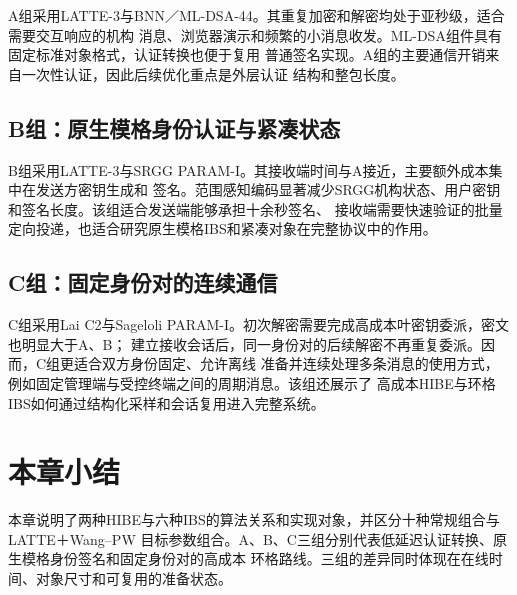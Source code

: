 A组采用LATTE-3与BNN／ML-DSA-44。其重复加密和解密均处于亚秒级，适合需要交互响应的机构
消息、浏览器演示和频繁的小消息收发。ML-DSA组件具有固定标准对象格式，认证转换也便于复用
普通签名实现。A组的主要通信开销来自一次性认证，因此后续优化重点是外层认证
结构和整包长度。

\subsection{B组：原生模格身份认证与紧凑状态}

B组采用LATTE-3与SRGG PARAM-I。其接收端时间与A接近，主要额外成本集中在发送方密钥生成和
签名。范围感知编码显著减少SRGG机构状态、用户密钥和签名长度。该组适合发送端能够承担十余秒签名、
接收端需要快速验证的批量定向投递，也适合研究原生模格IBS和紧凑对象在完整协议中的作用。

\subsection{C组：固定身份对的连续通信}

C组采用Lai C2与Sageloli PARAM-I。初次解密需要完成高成本叶密钥委派，密文也明显大于A、B；
建立接收会话后，同一身份对的后续解密不再重复委派。因而，C组更适合双方身份固定、允许离线
准备并连续处理多条消息的使用方式，例如固定管理端与受控终端之间的周期消息。该组还展示了
高成本HIBE与环格IBS如何通过结构化采样和会话复用进入完整系统。

\section{本章小结}

本章说明了两种HIBE与六种IBS的算法关系和实现对象，并区分十种常规组合与LATTE＋Wang--PW
目标参数组合。A、B、C三组分别代表低延迟认证转换、原生模格身份签名和固定身份对的高成本
环格路线。三组的差异同时体现在在线时间、对象尺寸和可复用的准备状态。
